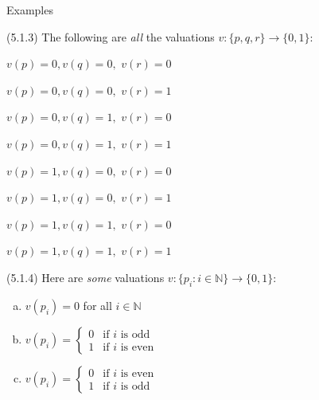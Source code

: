 \begin{frame}{Examples}

(5.1.3) The following are \emph{all} the valuations $v:\{p,q,r\}\to \{0,1\}$:
	
\vspace{2ex}
		\begin{minipage}{.45\linewidth}
		\begin{enumerate}[(a)]
		{\scriptsize
			\item $v(p)=0, v(q)=0,$  $v(r)=0$
			\item $v(p)=0, v(q)=0,$  $v(r)=1$
			\item $v(p)=0, v(q)=1,$  $v(r)=0$
			\item $v(p)=0, v(q)=1,$ $v(r)=1$
		}	 	
		\end{enumerate}
		\end{minipage}
		\begin{minipage}{.45\linewidth}
		\begin{enumerate}[(a)]
		{\scriptsize
			\item $v(p)=1, v(q)=0,$  $v(r)=0$
			\item $v(p)=1, v(q)=0,$  $v(r)=1$
			\item $v(p)=1, v(q)=1,$  $v(r)=0$
			\item $v(p)=1, v(q)=1,$ $v(r)=1$
		}	 	
		\end{enumerate}
		\end{minipage}
		
	\vspace{2ex}

 (5.1.4) Here are \emph{some} valuations $v:\{p_i:i\in\mathbb{N}\}\to\{0,1\}$:
		
		{\scriptsize\begin{enumerate}[(a)]
		
			\item $v(p_i)=0$ for all $i\in \mathbb{N}$
		
			\item $v(p_i)=\begin{cases} 0 & \text{if }i\text{ is odd}\\1 & \text{if }i\text{ is even}\end{cases}$
			
			\item $v(p_i)=\begin{cases} 0 & \text{if }i\text{ is even}\\1 & \text{if }i\text{ is odd}\end{cases}$
			

\end{enumerate}}
\end{frame}
